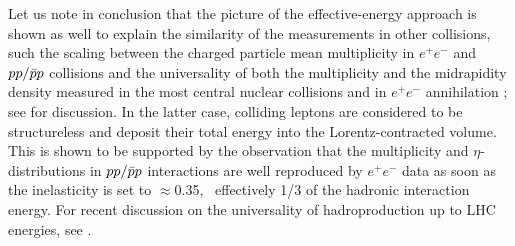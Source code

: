 \documentclass[twocolumn,showpacs,preprintnumbers,prd,superscriptaddress,nofootinbib]{revtex4}
\begin{document}
 Let us note in conclusion that
 the picture of the effective-energy approach is shown as well
  to 
 explain 
 the similarity of the measurements in other collisions, such the 
 scaling between the charged particle mean multiplicity in $e^+e^-$ and 
$pp/{\bar p}p$ collisions  and the universality of both the 
multiplicity and the midrapidity density measured in the most central 
nuclear collisions and in $e^+e^-$ annihilation ; see 
 for discussion.
 In the latter case, colliding leptons are considered to be structureless 
 and deposit their total energy into the Lorentz-contracted volume. 
 This 
is
 shown  to be supported 
 by 
the observation 
 that
 the multiplicity and $\eta$-distributions 
 in $pp/{\bar p}p$ interactions 
 are
 well reproduced by $e^+e^-$ data as soon as the inelasticity 
is set to $\approx$0.35, \ie\ effectively
  1/3 of the  hadronic interaction energy.
  For recent discussion on the universality of hadroproduction up to LHC 
energies, see .
\end{document}
